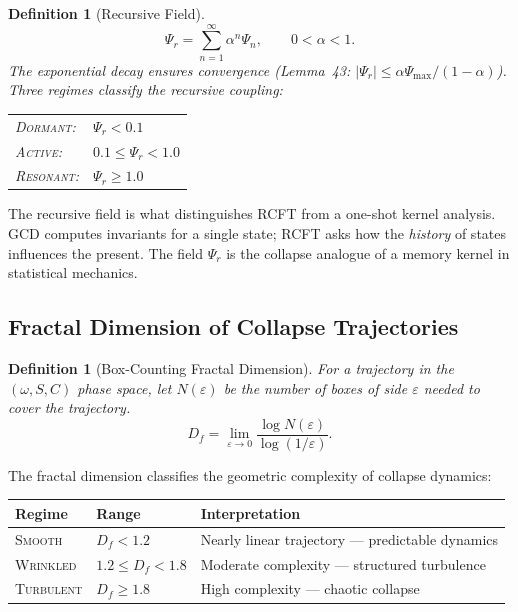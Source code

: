 \documentclass[
  aps,
  prd,
  preprint,
  superscriptaddress,
  nofootinbib,
  floatfix,
  longbibliography
]{revtex4-2}
\newtheorem{definition}[theorem]{Definition}
\newcommand{\eps}{\varepsilon}
\newcommand{\beq}{\begin{equation}}
\newcommand{\eeq}{\end{equation}}
\newcommand{\regime}[1]{\textrm{\upshape\scshape#1}}
\newcommand{\Drft}{\omega}
\newcommand{\Ent}{S}
\newcommand{\Curv}{C}
\newcommand{\Psifield}{\Psi}
\newcommand{\Psirec}{\Psi_{r}}
\begin{document}
\begin{definition}[Recursive Field]\label{def:psi_rec}
\beq
  \Psirec = \sum_{n=1}^{\infty} \alpha^n \Psifield_n,
  \qquad 0 < \alpha < 1.
\eeq
The exponential decay ensures convergence
(Lemma~43: $|\Psirec| \leq \alpha \Psifield_{\max} / (1-\alpha)$).
Three regimes classify the recursive coupling:
\begin{center}
\begin{tabular}{@{}ll@{}}
\regime{Dormant}:   & $\Psirec < 0.1$ \\
\regime{Active}:    & $0.1 \leq \Psirec < 1.0$ \\
\regime{Resonant}:  & $\Psirec \geq 1.0$ \\
\end{tabular}
\end{center}
\end{definition}

The recursive field is what distinguishes RCFT from
a one-shot kernel analysis.
GCD computes invariants for a single state; RCFT asks
how the \emph{history} of states influences the present.
The field $\Psirec$ is the collapse analogue of a
memory kernel in statistical mechanics.

\subsection{Fractal Dimension of Collapse Trajectories}

\begin{definition}[Box-Counting Fractal Dimension]\label{def:Df}
For a trajectory in the $(\Drft, \Ent, \Curv)$
phase space, let $N(\eps)$ be the number of boxes of
side $\eps$ needed to cover the trajectory.
\beq
  D_f = \lim_{\eps \to 0}
    \frac{\log N(\eps)}{\log(1/\eps)}.
\eeq
\end{definition}

The fractal dimension classifies the geometric
complexity of collapse dynamics:

\begin{center}
\begin{tabular}{@{}lll@{}}
\toprule
\textbf{Regime} & \textbf{Range} & \textbf{Interpretation} \\
\midrule
\regime{Smooth} & $D_f < 1.2$ &
  Nearly linear trajectory — predictable dynamics \\
\regime{Wrinkled} & $1.2 \leq D_f < 1.8$ &
  Moderate complexity — structured turbulence \\
\regime{Turbulent} & $D_f \geq 1.8$ &
  High complexity — chaotic collapse \\
\bottomrule
\end{tabular}
\end{center}
\end{document}
